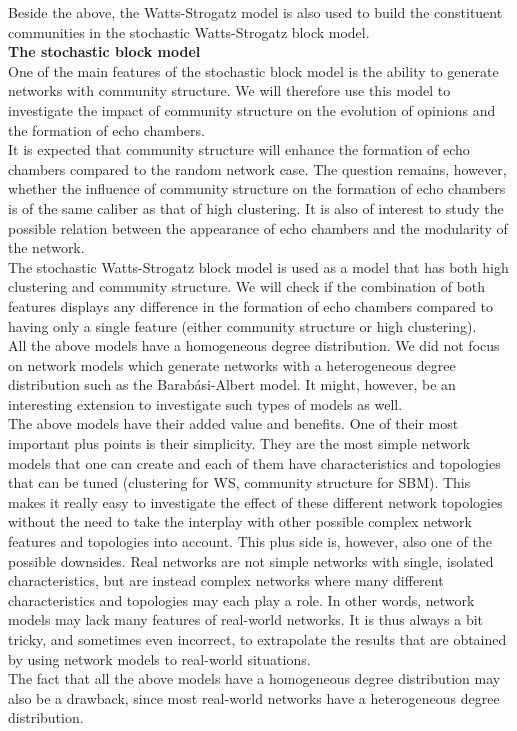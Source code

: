 \documentclass[11 pt , letterpaper , twoside , openright]{book}
\begin{document}
\newline
Beside the above, the Watts-Strogatz model is also used to build the constituent communities in the stochastic Watts-Strogatz block model.\\
\newline
\textbf{The stochastic block model}\\
\newline
One of the main features of the stochastic block model is the ability to generate networks with community structure. We will therefore use this model to investigate the impact of community structure on the evolution of opinions and the formation of echo chambers.\\
\newline
It is expected that community structure will enhance the formation of echo chambers compared to the random network case. The question remains, however, whether the influence of community structure on the formation of echo chambers is of the same caliber as that of high clustering. It is also of interest to study the possible relation between the appearance of echo chambers and the modularity of the network.\\
\newline
The stochastic Watts-Strogatz block model is used as a model that has both high clustering and community structure. We will check if the combination of both features displays any difference in the formation of echo chambers compared to having only a single feature (either community structure or high clustering).\\
\newline
All the above models have a homogeneous degree distribution. We did not focus on network models which generate networks with a heterogeneous degree distribution such as the Barab\'{a}si-Albert model. It might, however, be an interesting extension to investigate such types of models as well.\\
\newline
The above models have their added value and benefits. One of their most important plus points is their simplicity. They are the most simple network models that one can create and each of them have characteristics and topologies that can be tuned (clustering for WS, community structure for SBM). This makes it really easy to investigate the effect of these different network topologies without the need to take the interplay with other possible complex network features and topologies into account. This plus side is, however, also one of the possible downsides. Real networks are not simple networks with single, isolated characteristics, but are instead complex networks where many different characteristics and topologies may each play a role. In other words, network models may lack many features of real-world networks. It is thus always a bit tricky, and sometimes even incorrect, to extrapolate the results that are obtained by using network models to real-world situations.\\
\newline
The fact that all the above models have a homogeneous degree distribution may also be a drawback, since most real-world networks have a heterogeneous degree distribution.
\end{document}
